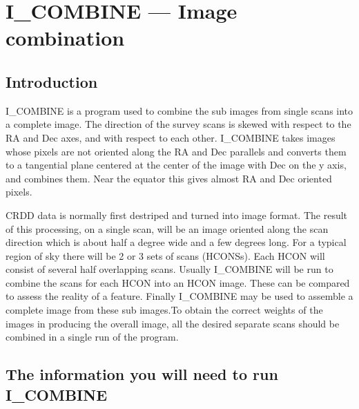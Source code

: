 \section {I\_COMBINE --- Image combination}

\subsection {Introduction}

I\_COMBINE is a program used to combine the sub images from single scans into a
complete image. The direction of the survey scans is skewed with respect to the
RA and Dec axes, and with respect to each other. I\_COMBINE takes images whose
pixels are not oriented along the RA and Dec parallels and converts them to a
tangential plane centered at the center of the image with Dec on the y axis,
and combines them. Near the equator this gives almost RA and Dec oriented
pixels.

CRDD data is normally first destriped and turned into image format. The result
of this processing, on a single scan, will be an image oriented along the scan
direction which is about half a degree wide and a few degrees long. For a
typical region of sky there will be 2 or 3 sets of scans (HCONSs). Each HCON
will consist of several half overlapping scans. Usually  I\_COMBINE will be run
to combine the scans for each HCON into an HCON image.
These can be compared to assess the reality
of a feature. Finally I\_COMBINE may be used to assemble a complete image from
these sub images.To obtain the correct weights of the images in producing the
overall image, all the desired separate scans should be combined in a single
run of the program.


\subsection {The information you will need to run I\_COMBINE}

